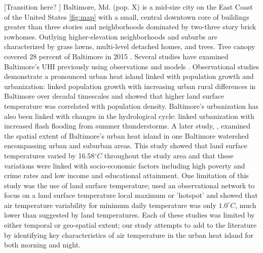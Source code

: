 \documentclass[draft,linenumbers]{agujournal}
\begin{document}
[Transition here? ] Baltimore, Md. (pop. X) is a mid-size city on the East Coast of the United States \ref{fig:map}  with a small, central downtown core of buildings greater than three stories and  neighborhoods dominated by two-three story brick rowhomes. Outlying higher-elevation neighborhoods and suburbs are characterized by grass lawns, multi-level detached homes, and trees. Tree canopy covered 28 percent of Baltimore in 2015 \cite{grove2011urban}. 
 Several studies have examined Baltimore's UHI previously using observations \citep{Huang20111753,scott2017intraurban,brazel2000tale} and models \citep{zhang2011impact,li2013development,li2013synergistic,li2015contrasting}. 
Observational studies demonstrate a pronounced urban heat island linked with population growth and urbanization: \cite{brazel2000tale} linked population growth with increasing urban rural differences in Baltimore over decadal timescales and showed that higher land surface temperature was correlated with population density. Baltimore's urbanization has also been linked with changes in the hydrological cycle: \cite{ntelekos2007climatological
} linked urbanization with increased flash flooding from summer thunderstorms.   
 A later study,
\cite{Huang20111753}, examined the spatial extent of Baltimore's urban heat island in one Baltimore watershed encompassing urban and suburban areas. This study showed that land surface temperatures varied by 16.58$^\circ C$ throughout the study area and that these variations were linked with socio-economic factors including high poverty and crime rates and low income and educational attainment. One limitation of this study was the use of land surface temperature; \cite{scott2017intraurban} used an observational network to focus on a land surface temperature local maximum or 'hotspot' and showed that air temperature variability for minimum daily temperature was only $1.0^\circ C$, much lower than suggested by land temperatures. Each of these studies was limited by either temporal or geo-spatial extent; our study attempts to add to the literature by identifying key characteristics of air temperature in the urban heat island for both morning and night. 
\end{document}
